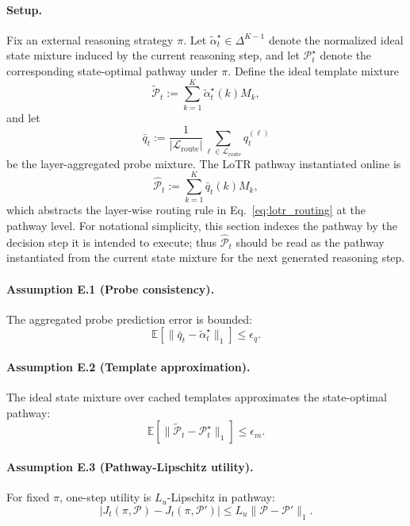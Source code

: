 \paragraph{Setup.}
Fix an external reasoning strategy \(\pi\). Let \(\tilde{\alpha}_t^\star\in\Delta^{K-1}\) denote the normalized ideal state mixture induced by the current reasoning step, and let \(\mathcal{P}_t^\star\) denote the corresponding state-optimal pathway under \(\pi\). Define the ideal template mixture
\begin{equation}
\widetilde{\mathcal{P}}_t
:=
\sum_{k=1}^{K}\tilde{\alpha}_t^\star(k) M_k,
\label{eq:app_improve_ideal_mix}
\end{equation}
and let
\[
\bar q_t:=\frac{1}{|\mathcal{L}_{\mathrm{route}}|}\sum_{\ell\in\mathcal{L}_{\mathrm{route}}} q_t^{(\ell)}
\]
be the layer-aggregated probe mixture. The LoTR pathway instantiated online is
\begin{equation}
\widehat{\mathcal{P}}_t
:=
\sum_{k=1}^{K}\bar q_t(k) M_k,
\label{eq:app_improve_hat_path}
\end{equation}
which abstracts the layer-wise routing rule in Eq.~\eqref{eq:lotr_routing} at the pathway level. For notational simplicity, this section indexes the pathway by the decision step it is intended to execute; thus \(\widehat{\mathcal{P}}_t\) should be read as the pathway instantiated from the current state mixture for the next generated reasoning step.

\paragraph{Assumption E.1 (Probe consistency).}
The aggregated probe prediction error is bounded:
\begin{equation}
\mathbb{E}\!\left[\|\bar q_t-\tilde{\alpha}_t^\star\|_1\right]\le \epsilon_q.
\label{eq:app_improve_probe_err}
\end{equation}

\paragraph{Assumption E.2 (Template approximation).}
The ideal state mixture over cached templates approximates the state-optimal pathway:
\begin{equation}
\mathbb{E}\!\left[\|\widetilde{\mathcal{P}}_t-\mathcal{P}_t^\star\|_1\right]\le \epsilon_m.
\label{eq:app_improve_template_err}
\end{equation}

\paragraph{Assumption E.3 (Pathway-Lipschitz utility).}
For fixed \(\pi\), one-step utility is \(L_u\)-Lipschitz in pathway:
\begin{equation}
|J_t(\pi,\mathcal{P})-J_t(\pi,\mathcal{P}')|
\le
L_u\|\mathcal{P}-\mathcal{P}'\|_1.
\label{eq:app_improve_lipschitz}
\end{equation}

